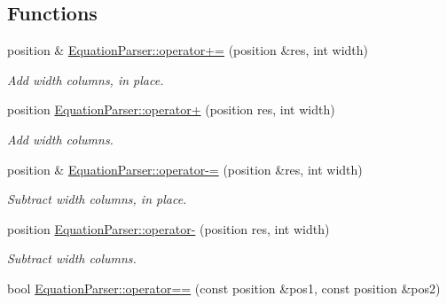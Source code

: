 \subsection*{Functions}
\begin{DoxyCompactItemize}
\item 
position \& \hyperlink{position_8hh_a30d80250779ad678598b834e7788485a}{Equation\+Parser\+::operator+=} (position \&res, int width)\hypertarget{position_8hh_a30d80250779ad678598b834e7788485a}{}\label{position_8hh_a30d80250779ad678598b834e7788485a}

\begin{DoxyCompactList}\small\item\em Add {\itshape width} columns, in place. \end{DoxyCompactList}\item 
position \hyperlink{position_8hh_a621f9d25f0653747d3f3d20d34c53f9a}{Equation\+Parser\+::operator+} (position res, int width)\hypertarget{position_8hh_a621f9d25f0653747d3f3d20d34c53f9a}{}\label{position_8hh_a621f9d25f0653747d3f3d20d34c53f9a}

\begin{DoxyCompactList}\small\item\em Add {\itshape width} columns. \end{DoxyCompactList}\item 
position \& \hyperlink{position_8hh_aee2a0c6a6a473a180040bfeebca6e979}{Equation\+Parser\+::operator-\/=} (position \&res, int width)\hypertarget{position_8hh_aee2a0c6a6a473a180040bfeebca6e979}{}\label{position_8hh_aee2a0c6a6a473a180040bfeebca6e979}

\begin{DoxyCompactList}\small\item\em Subtract {\itshape width} columns, in place. \end{DoxyCompactList}\item 
position \hyperlink{position_8hh_af7ea3e08e7576a7816af3a4079a59151}{Equation\+Parser\+::operator-\/} (position res, int width)\hypertarget{position_8hh_af7ea3e08e7576a7816af3a4079a59151}{}\label{position_8hh_af7ea3e08e7576a7816af3a4079a59151}

\begin{DoxyCompactList}\small\item\em Subtract {\itshape width} columns. \end{DoxyCompactList}\item 
bool \hyperlink{position_8hh_a232c1cc2b99e62cd1eb668a9f708bb72}{Equation\+Parser\+::operator==} (const position \&pos1, const position \&pos2)\hypertarget{position_8hh_a232c1cc2b99e62cd1eb668a9f708bb72}{}\label{position_8hh_a232c1cc2b99e62cd1eb668a9f708bb72}


\end{DoxyCompactItemize}

